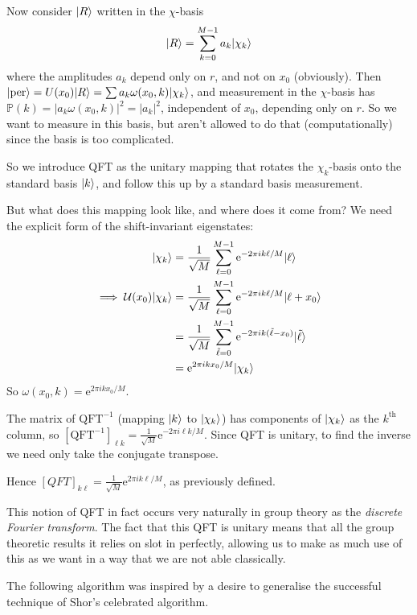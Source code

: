 \documentclass[]{article}
\DeclarePairedDelimiter\ket{\lvert}{\rangle}
\theoremstyle{custhm}
\theoremstyle{cusdef}
\theoremstyle{custhm}
\theoremstyle{custhm}
\theoremstyle{custhm}
\theoremstyle{custhm}
\theoremstyle{cusdef}
\theoremstyle{remark}
\newcommand{\e}{\mathrm{e}}
\renewcommand{\P}{\mathbb{P}}
\renewcommand{\it}[1]{\textit{#1}}
\newcommand{\U}{\mathcal{U}}
\newcommand{\QFT}{\textrm{QFT}}
\newcommand{\per}{\ket{\textrm{per}}}
\begin{document}
Now consider $\ket{R}$ written in the $\chi$-basis
\begin{align*}
\ket{R} = \sum_{k=0}^{M-1}a_k\ket{\chi_k}
\end{align*}
where the amplitudes $a_k$ depend only on $r$, and not on $x_0$ (obviously). Then $\per = U(x_0)\ket{R} = \sum a_k\omega(x_0,k)\ket{\chi_k}$, and measurement in the $\chi$-basis has $\P(k) = |a_k\omega(x_0,k)|^2 = |a_k|^2$, independent of $x_0$, depending only on $r$. So we want to measure in this basis, but aren't allowed to do that (computationally) since the basis is too complicated.

So we introduce QFT as the unitary mapping that rotates the $\chi_k$-basis onto the standard basis $\ket{k}$, and follow this up by a standard basis measurement.

But what does this mapping look like, and where does it come from? We need the explicit form of the shift-invariant eigenstates:
\begin{align*}
	\ket{\chi_k} &= \frac{1}{\sqrt{M}}\sum_{\ell = 0}^{M-1}\e^{-2\pi ik\ell/M}\ket{\ell}\\
	\implies \U(x_0)\ket{\chi_k} &= \frac{1}{\sqrt{M}}\sum_{\ell = 0}^{M-1}\e^{-2\pi ik\ell/M}\ket{\ell + x_0}\\
	&= \frac{1}{\sqrt{M}}\sum_{\tilde{\ell} = 0}^{M-1}\e^{-2\pi i k(\tilde{\ell} - x_0)}\ket{\tilde{\ell}}\\
	&= \e^{2\pi i kx_0/M}\ket{\chi_k}
\end{align*}
So $\omega(x_0,k) = \e^{2\pi i k x_0/M}$.

The matrix of $\QFT^{-1}$ (mapping $\ket{k}$ to $\ket{\chi_k}$) has components of $\ket{\chi_k}$ as the $k^{\textrm{th}}$ column, so $[\QFT^{-1}]_{\ell k} = \frac{1}{\sqrt{M}}\e^{-2\pi i\ell k/M}$. Since QFT is unitary, to find the inverse we need only take the conjugate transpose.

Hence $[QFT]_{k\ell} = \frac{1}{\sqrt{M}}\e^{2\pi ik\ell/M}$, as previously defined.

This notion of QFT in fact occurs very naturally in group theory as the \it{discrete Fourier transform}. The fact that this QFT is unitary means that all the group theoretic results it relies on slot in perfectly, allowing us to make as much use of this as we want in a way that we are not able classically.


The following algorithm was inspired by a desire to generalise the successful technique of Shor's celebrated algorithm.
\end{document}

